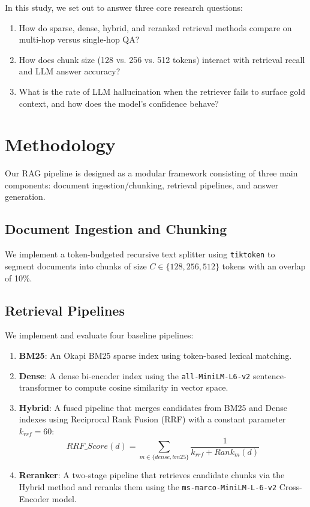 \documentclass{article}
\begin{document}
In this study, we set out to answer three core research questions:
\begin{enumerate}
    \item[\textbf{RQ1}] How do sparse, dense, hybrid, and reranked retrieval methods compare on multi-hop versus single-hop QA?
    \item[\textbf{RQ2}] How does chunk size (128 vs. 256 vs. 512 tokens) interact with retrieval recall and LLM answer accuracy?
    \item[\textbf{RQ3}] What is the rate of LLM hallucination when the retriever fails to surface gold context, and how does the model's confidence behave?
\end{enumerate}

\section{Methodology}
Our RAG pipeline is designed as a modular framework consisting of three main components: document ingestion/chunking, retrieval pipelines, and answer generation.

\subsection{Document Ingestion and Chunking}
We implement a token-budgeted recursive text splitter using \texttt{tiktoken} to segment documents into chunks of size $C \in \{128, 256, 512\}$ tokens with an overlap of 10\%.

\subsection{Retrieval Pipelines}
We implement and evaluate four baseline pipelines:
\begin{enumerate}
    \item \textbf{BM25}: An Okapi BM25 sparse index using token-based lexical matching.
    \item \textbf{Dense}: A dense bi-encoder index using the \texttt{all-MiniLM-L6-v2} sentence-transformer to compute cosine similarity in vector space.
    \item \textbf{Hybrid}: A fused pipeline that merges candidates from BM25 and Dense indexes using Reciprocal Rank Fusion (RRF) with a constant parameter $k_{rrf} = 60$:
    \begin{equation}
        RRF\_Score(d) = \sum_{m \in \{dense, bm25\}} \frac{1}{k_{rrf} + Rank_m(d)}
    \end{equation}
    \item \textbf{Reranker}: A two-stage pipeline that retrieves candidate chunks via the Hybrid method and reranks them using the \texttt{ms-marco-MiniLM-L-6-v2} Cross-Encoder model.
\end{enumerate}
\end{document}
